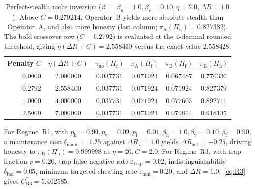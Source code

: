 \documentclass[11pt,a4paper]{article}
\begin{document}
\begin{table}[ht]
\centering
\caption{Perfect-stealth niche inversion ($\beta_{\mathrm{f}} = \beta_{\mathrm{h}} = 1.0, \beta_{\mathrm{v}} = 0.10, \eta = 2.0, \Delta R = 1.0$). Above $C = 0.279214$, Operator~B yields more absolute stealth than Operator~A, and also more honesty (last column; $\pi_{\mathrm{A}}(\Pi_{\mathrm{h}}) = 0.827382$). The bold crossover row ($C = 0.2792$) is evaluated at the 4-decimal rounded threshold, giving $\eta(\Delta R + C) = 2.558400$ versus the exact value $2.558428$.}
\label{tab:niche}
\small
\begin{tabular}{@{}rccccc@{}}
\toprule
Penalty $C$ & $\eta(\Delta R + C)$ & $\pi_{\mathrm{no}}(\Pi_{\mathrm{f}})$ & $\pi_{\mathrm{A}}(\Pi_{\mathrm{f}})$ & $\pi_{\mathrm{B}}(\Pi_{\mathrm{f}})$ & $\pi_{\mathrm{B}}(\Pi_{\mathrm{h}})$ \\
\midrule
$0.0000$ & $2.000000$ & $0.037731$ & $0.071924$ & $0.067487$ & $0.776336$ \\
$\mathbf{0.2792}$ & $\mathbf{2.558400}$ & $0.037731$ & $\mathbf{0.071924}$ & $\mathbf{0.071924}$ & $0.827379$ \\
$1.0000$ & $4.000000$ & $0.037731$ & $0.071924$ & $0.077603$ & $0.892711$ \\
$2.5000$ & $7.000000$ & $0.037731$ & $0.071924$ & $\mathbf{0.079814}$ & $0.918135$ \\
\bottomrule
\end{tabular}
\end{table}

For Regime~R1, with $p_{\mathrm{h}} = 0.90, p_{\mathrm{v}} = 0.09, p_{\mathrm{f}} = 0.01, \beta_{\mathrm{h}} = 1.0, \beta_{\mathrm{v}} = 0.10, \beta_{\mathrm{f}} = 0.90$, a maintenance cost $\delta_{\mathrm{maint}} = 1.25$ against $\Delta R_{\mathrm{v}} = 1.0$ yields $\Delta R_{\mathrm{net}} = -0.25$, driving honesty to $\pi_{\mathrm{B}}(\Pi_{\mathrm{h}}) = 0.999998$ at $\eta = 20, C = 2.0$. For Regime~R3, with trap fraction $\rho = 0.20$, trap false-negative rate $\varepsilon_{\mathrm{trap}} = 0.02$, indistinguishability $\delta_{\mathrm{ind}} = 0.05$, minimum targeted cheating rate $\tau_{\min} = 0.20$, and $\Delta R = 1.0$,~\eqref{eq:R3} gives $C_{\mathrm{R3}}^* = 5.462585$.
\end{document}
